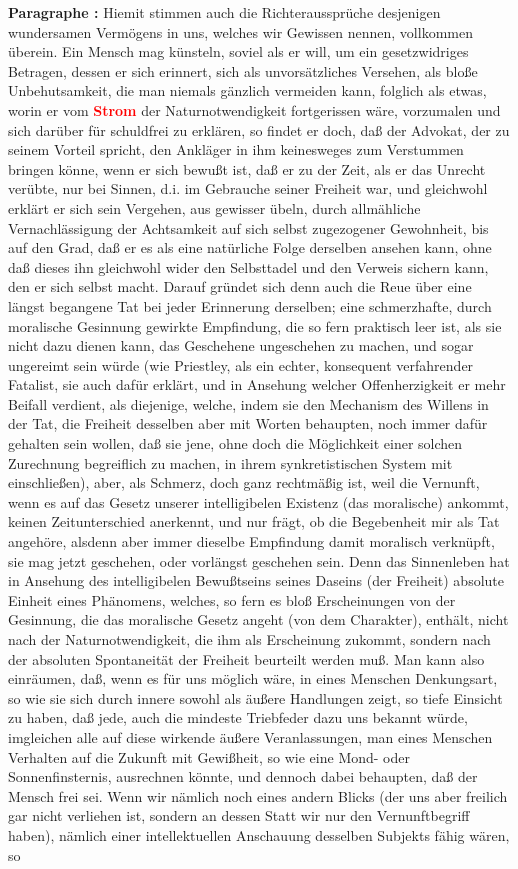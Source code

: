 \documentclass[a4paper,12pt,twoside]{book}
\newcommand{\match}[1]{\textcolor{red}{\textbf{#1}}}
\begin{document}
	\noindent\textbf{Paragraphe : }Hiemit stimmen auch die Richteraussprüche desjenigen wundersamen Vermögens in uns, welches wir Gewissen nennen, vollkommen überein. Ein Mensch mag künsteln, soviel als er will, um ein gesetzwidriges Betragen, dessen er sich  erinnert, sich als unvorsätzliches Versehen, als bloße Unbehutsamkeit, die man niemals gänzlich vermeiden kann, folglich als etwas, worin er vom \match{Strom} der Naturnotwendigkeit fortgerissen wäre, vorzumalen und sich darüber für schuldfrei zu erklären, so findet er doch, daß der Advokat, der zu seinem Vorteil spricht, den Ankläger in ihm keinesweges zum Verstummen bringen könne, wenn er sich bewußt ist, daß er zu der Zeit, als er das Unrecht verübte, nur bei Sinnen, d.i. im Gebrauche seiner Freiheit war, und gleichwohl erklärt er sich sein Vergehen, aus gewisser übeln, durch allmähliche Vernachlässigung der Achtsamkeit auf sich selbst zugezogener Gewohnheit, bis auf den Grad, daß er es als eine natürliche Folge derselben ansehen kann, ohne daß dieses ihn gleichwohl wider den Selbsttadel und den Verweis sichern kann, den er sich selbst macht. Darauf gründet sich denn auch die Reue über eine längst begangene Tat bei jeder Erinnerung derselben; eine schmerzhafte, durch moralische Gesinnung gewirkte Empfindung, die so fern praktisch leer ist, als sie nicht dazu dienen kann, das Geschehene ungeschehen zu machen, und sogar ungereimt sein würde (wie Priestley, als ein echter, konsequent verfahrender Fatalist, sie auch dafür erklärt, und in Ansehung welcher Offenherzigkeit er mehr Beifall verdient, als diejenige, welche, indem sie den Mechanism des Willens in der Tat, die Freiheit desselben aber mit Worten behaupten, noch immer dafür gehalten sein wollen, daß sie jene, ohne doch die Möglichkeit einer solchen Zurechnung begreiflich zu machen, in ihrem synkretistischen System mit einschließen), aber, als Schmerz, doch ganz rechtmäßig ist, weil die Vernunft, wenn es auf das Gesetz unserer intelligibelen Existenz (das moralische) ankommt, keinen Zeitunterschied anerkennt, und nur frägt, ob die Begebenheit mir als Tat angehöre, alsdenn aber immer dieselbe Empfindung damit moralisch verknüpft, sie mag jetzt geschehen, oder vorlängst geschehen sein. Denn das Sinnenleben hat in Ansehung des intelligibelen Bewußtseins seines Daseins (der Freiheit) absolute Einheit eines Phänomens, welches, so fern es bloß Erscheinungen von der Gesinnung, die das moralische Gesetz angeht  (von dem Charakter), enthält, nicht nach der Naturnotwendigkeit, die ihm als Erscheinung zukommt, sondern nach der absoluten Spontaneität der Freiheit beurteilt werden muß. Man kann also einräumen, daß, wenn es für uns möglich wäre, in eines Menschen Denkungsart, so wie sie sich durch innere sowohl als äußere Handlungen zeigt, so tiefe Einsicht zu haben, daß jede, auch die mindeste Triebfeder dazu uns bekannt würde, imgleichen alle auf diese wirkende äußere Veranlassungen, man eines Menschen Verhalten auf die Zukunft mit Gewißheit, so wie eine Mond- oder Sonnenfinsternis, ausrechnen könnte, und dennoch dabei behaupten, daß der Mensch frei sei. Wenn wir nämlich noch eines andern Blicks (der uns aber freilich gar nicht verliehen ist, sondern an dessen Statt wir nur den Vernunftbegriff haben), nämlich einer intellektuellen Anschauung desselben Subjekts fähig wären, so 
\end{document}

